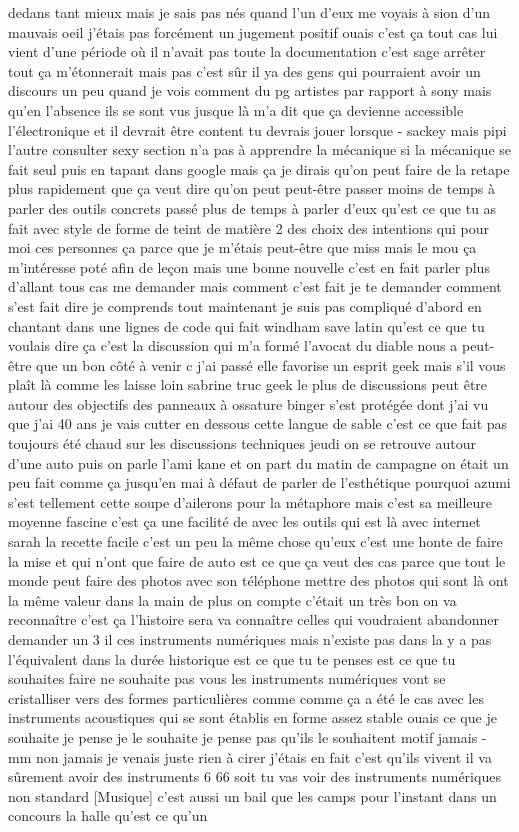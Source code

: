 dedans tant mieux mais je sais pas nés quand l'un d'eux me voyais à sion d'un mauvais oeil j'étais pas forcément un jugement positif ouais c'est ça tout cas lui vient d'une période où il n'avait pas toute la documentation c'est sage arrêter tout ça m'étonnerait mais pas c'est sûr il ya des gens qui pourraient avoir un discours un peu quand je vois comment du pg artistes par rapport à sony mais qu'en l'absence ils se sont vus jusque là m'a dit que ça devienne accessible l'électronique et il devrait être content tu devrais jouer lorsque - sackey mais pipi l'autre consulter sexy section n'a pas à apprendre la mécanique si la mécanique se fait seul puis en tapant dans google mais ça je dirais qu'on peut faire de la retape plus rapidement que ça veut dire qu'on peut peut-être passer moins de temps à parler des outils concrets passé plus de temps à parler d'eux qu'est ce que tu as fait avec style de forme de teint de matière 2 des choix des intentions qui pour moi ces personnes ça parce que je m'étais peut-être que miss mais le mou ça m'intéresse poté afin de leçon mais une bonne nouvelle c'est en fait parler plus d'allant tous cas me demander mais comment c'est fait je te demander comment s'est fait dire je comprends tout maintenant je suis pas compliqué d'abord en chantant dans une lignes de code qui fait windham save latin qu'est ce que tu voulais dire ça c'est la discussion qui m'a formé l'avocat du diable nous a peut-être que un bon côté à venir c j'ai passé elle favorise un esprit geek mais s'il vous plaît là comme les laisse loin sabrine truc geek le plus de discussions peut être autour des objectifs des panneaux à ossature binger s'est protégée dont j'ai vu que j'ai 40 ans je vais cutter en dessous cette langue de sable c'est ce que fait pas toujours été chaud sur les discussions techniques jeudi on se retrouve autour d'une auto puis on parle l'ami kane et on part du matin de campagne on était un peu fait comme ça jusqu'en mai à défaut de parler de l'esthétique pourquoi azumi s'est tellement cette soupe d'ailerons pour la métaphore mais c'est sa meilleure moyenne fascine c'est ça une facilité de avec les outils qui est là avec internet sarah la recette facile c'est un peu la même chose qu'eux c'est une honte de faire la mise et qui n'ont que faire de auto est ce que ça veut des cas parce que tout le monde peut faire des photos avec son téléphone mettre des photos qui sont là ont la même valeur dans la main de plus on compte c'était un très bon on va reconnaître c'est ça l'histoire sera va connaître celles qui voudraient abandonner demander un 3 il ces instruments numériques mais n'existe pas dans la y a pas l'équivalent dans la durée historique est ce que tu te penses est ce que tu souhaites faire ne souhaite pas vous les instruments numériques vont se cristalliser vers des formes particulières comme comme ça a été le cas avec les instruments acoustiques qui se sont établis en forme assez stable ouais ce que je souhaite je pense je le souhaite je pense pas qu'ils le souhaitent motif jamais - mm non jamais je venais juste rien à cirer j'étais en fait c'est qu'ils vivent il va sûrement avoir des instruments 6 66 soit tu vas voir des instruments numériques non standard [Musique] c'est aussi un bail que les camps pour l'instant dans un concours la halle qu'est ce qu'un 
